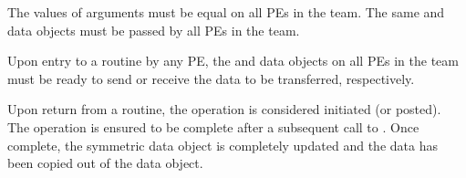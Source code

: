 \begin{apidefinition}
{    The values of arguments  must be equal on all \acp{PE}
    in the team.
    The same \dest{} and \source{} data objects must be passed by
    all \acp{PE} in the team.

    Upon entry to a  routine by any \ac{PE},
    the \source{} and \dest{} data objects on all \acp{PE} in the team must
    be ready to send or receive the data to be transferred, respectively.

    Upon return from a  routine,
    the operation is considered initiated (or posted).
    The operation is ensured to be complete after a subsequent call to
    .
    Once complete, the \dest{} symmetric data object is completely updated
    and the data has been copied out of the \source{} data object.
}




\end{apidefinition}

